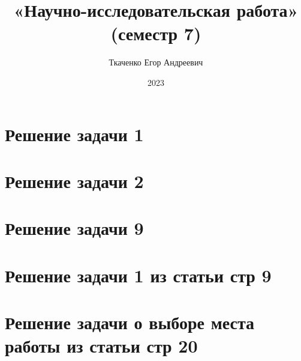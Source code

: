 \documentclass[specialist, substylefile = spbureport.rtx,
    subf,href,colorlinks=true, 12pt]{disser}
\title{«Научно-исследовательская работа» (семестр 7)}
\author{Ткаченко Егор Андреевич}
\date{2023}
\begin{document}


       




    \section{Решение задачи 1}
    
    \section{Решение задачи 2}
    
    \section{Решение задачи 9}
    
    \section{Решение задачи 1 из статьи стр 9}
    
    \section{Решение задачи о выборе места работы из статьи стр 20}
        
    






\end{document}
